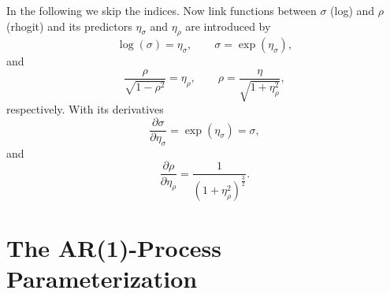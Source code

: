 \documentclass{article}
\begin{document}
In the following we skip the indices. Now link functions between $\sigma$ (log) and $\rho$ (rhogit) and its predictors $\eta_{\sigma}$ and $\eta_{\rho}$ are introduced by
%
\begin{equation}
 \log(\sigma) = \eta_{\sigma}, \qquad \sigma = \exp( \eta_{\sigma} ),
\end{equation}
%
and
%
\begin{equation}
 \frac{\rho}{\sqrt{1-\rho^2}} = \eta_{\rho}, \qquad \rho = \frac{\eta}{\sqrt{1+\eta_{\rho}^2}},
\end{equation} 
%
respectively. With its derivatives
%
\begin{equation}
 \frac{\partial \sigma}{\partial \eta_{\sigma}} = \exp(\eta_{\sigma}) = \sigma,
\end{equation}
%
and
%
\begin{equation}
 \frac{\partial \rho}{\partial \eta_{\rho}} = \frac{1}{(1+\eta_{\rho}^2)^\frac{3}{2}}.
\end{equation}
%

\newpage
\section{The AR(1)-Process Parameterization}
\end{document}
